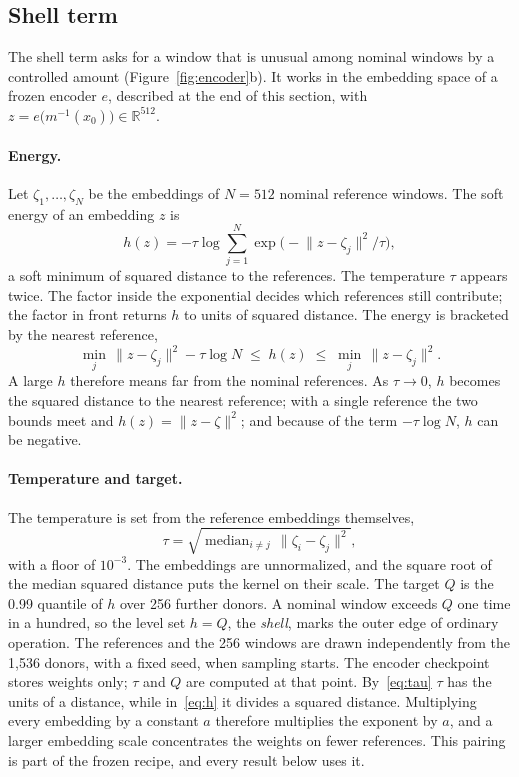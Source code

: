 \documentclass[11pt,a4paper]{article}
\newcommand{\R}{\mathbb{R}}
\newcommand{\xhat}{\hat{x}_{0}}            %
\newcommand{\norm}[1]{\lVert #1 \rVert}
\DeclareMathOperator*{\median}{median}
\begin{document}
\subsection{Shell term}
\label{sec:shell}

The shell term asks for a window that is unusual among nominal windows by a
controlled amount (Figure~\ref{fig:encoder}b). It works in the embedding space
of a frozen encoder $e$, described at the end of this section, with
$z = e\bigl(m^{-1}(\xhat)\bigr) \in \R^{512}$.

\paragraph{Energy.}
Let $\zeta_{1}, \ldots, \zeta_{N}$ be the embeddings of $N = 512$ nominal
reference windows. The soft energy of an embedding $z$ is
\begin{equation}
\label{eq:h}
h(z)
  = -\tau \log \sum_{j=1}^{N}
    \exp\bigl(-\norm{z - \zeta_{j}}^{2} / \tau\bigr),
\end{equation}
a soft minimum of squared distance to the references. The temperature $\tau$
appears twice. The factor inside the exponential decides which references
still contribute; the factor in front returns $h$ to units of squared
distance. The energy is bracketed by the nearest reference,
\begin{equation}
\label{eq:hbound}
\min_{j}\,\norm{z - \zeta_{j}}^{2} - \tau \log N
  \;\le\; h(z) \;\le\;
\min_{j}\,\norm{z - \zeta_{j}}^{2}.
\end{equation}
A large $h$ therefore means far from the nominal references. As $\tau \to 0$,
$h$ becomes the squared distance to the nearest reference; with a single
reference the two bounds meet and $h(z) = \norm{z - \zeta}^{2}$; and because
of the term $-\tau \log N$, $h$ can be negative.

\paragraph{Temperature and target.}
The temperature is set from the reference embeddings themselves,
\begin{equation}
\label{eq:tau}
\tau
  = \sqrt{\median_{i \neq j}\,
      \norm{\zeta_{i} - \zeta_{j}}^{2}},
\end{equation}
with a floor of $10^{-3}$. The embeddings are unnormalized, and the square root
of the median squared distance puts the kernel on their scale. The target $Q$
is the 0.99 quantile of $h$ over 256 further donors. A nominal window exceeds
$Q$ one time in a hundred, so the level set $h = Q$, the \emph{shell}, marks
the outer edge of ordinary operation. The references and the 256 windows are
drawn independently from the 1{,}536 donors, with a fixed seed, when sampling
starts. The encoder checkpoint stores weights only; $\tau$ and $Q$ are
computed at that point. By~\eqref{eq:tau} $\tau$ has the units of a distance,
while in~\eqref{eq:h} it divides a squared distance. Multiplying every
embedding by a constant $a$ therefore multiplies the exponent by $a$, and a
larger embedding scale concentrates the weights on fewer references. This
pairing is part of the frozen recipe, and every result below uses it.
\end{document}

